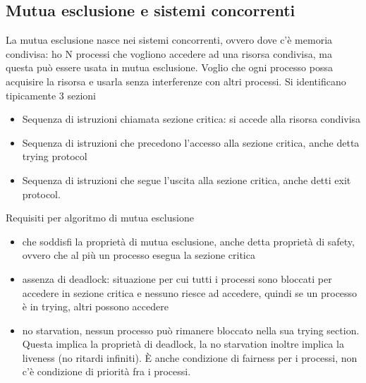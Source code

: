 \documentclass{article}
\begin{document}
\subsection{Mutua esclusione e sistemi concorrenti}
La mutua esclusione nasce nei sistemi concorrenti, ovvero dove c'è memoria condivisa: ho N processi che vogliono accedere ad una risorsa condivisa, ma questa può essere usata in mutua esclusione. Voglio che ogni processo possa acquisire la risorsa e usarla senza interferenze con altri processi. Si identificano tipicamente 3 sezioni
\begin{itemize}
\item Sequenza di istruzioni chiamata sezione critica: si accede alla risorsa condivisa
\item Sequenza di istruzioni che precedono l'accesso alla sezione critica, anche detta trying protocol
\item Sequenza di istruzioni che segue l'uscita alla sezione critica, anche detti exit protocol.
\end{itemize}
Requisiti per algoritmo di mutua esclusione 
\begin{itemize}
\item che soddisfi la proprietà di mutua esclusione, anche detta proprietà di safety, ovvero che al più un processo esegua la sezione critica
\item assenza di deadlock: situazione per cui tutti i processi sono bloccati per accedere in sezione critica e nessuno riesce ad accedere, quindi se un processo è in trying, altri possono accedere
\item no starvation, nessun processo può rimanere bloccato nella sua trying section. Questa implica la proprietà di deadlock, la no starvation inoltre implica la liveness (no ritardi infiniti). È anche condizione di fairness per i processi, non c'è condizione di priorità fra i processi.
\end{itemize}
\end{document}
